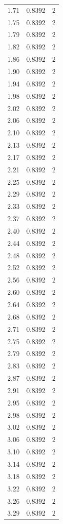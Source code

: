 \begin{longtable}{lrr}
  1.71 & 0.8392 & 2 \\
  1.75 & 0.8392 & 2 \\
  1.79 & 0.8392 & 2 \\
  1.82 & 0.8392 & 2 \\
  1.86 & 0.8392 & 2 \\
  1.90 & 0.8392 & 2 \\
  1.94 & 0.8392 & 2 \\
  1.98 & 0.8392 & 2 \\
  2.02 & 0.8392 & 2 \\
  2.06 & 0.8392 & 2 \\
  2.10 & 0.8392 & 2 \\
  2.13 & 0.8392 & 2 \\
  2.17 & 0.8392 & 2 \\
  2.21 & 0.8392 & 2 \\
  2.25 & 0.8392 & 2 \\
  2.29 & 0.8392 & 2 \\
  2.33 & 0.8392 & 2 \\
  2.37 & 0.8392 & 2 \\
  2.40 & 0.8392 & 2 \\
  2.44 & 0.8392 & 2 \\
  2.48 & 0.8392 & 2 \\
  2.52 & 0.8392 & 2 \\
  2.56 & 0.8392 & 2 \\
  2.60 & 0.8392 & 2 \\
  2.64 & 0.8392 & 2 \\
  2.68 & 0.8392 & 2 \\
  2.71 & 0.8392 & 2 \\
  2.75 & 0.8392 & 2 \\
  2.79 & 0.8392 & 2 \\
  2.83 & 0.8392 & 2 \\
  2.87 & 0.8392 & 2 \\
  2.91 & 0.8392 & 2 \\
  2.95 & 0.8392 & 2 \\
  2.98 & 0.8392 & 2 \\
  3.02 & 0.8392 & 2 \\
  3.06 & 0.8392 & 2 \\
  3.10 & 0.8392 & 2 \\
  3.14 & 0.8392 & 2 \\
  3.18 & 0.8392 & 2 \\
  3.22 & 0.8392 & 2 \\
  3.26 & 0.8392 & 2 \\
  3.29 & 0.8392 & 2 \\

\end{longtable}
